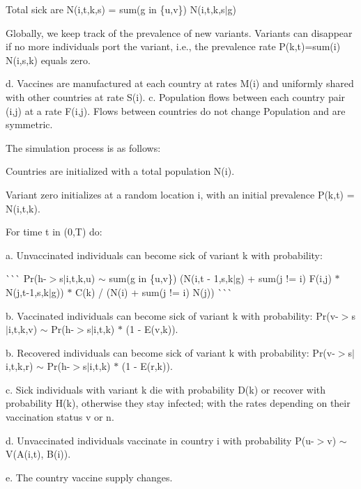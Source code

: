 \begin{DoxyEnumerate}
Total sick are {\ttfamily N(i,t,k,s) = sum(g in \{u,v\}) N(i,t,k,s$\vert$g)}

Globally, we keep track of the prevalence of new variants. Variants can disappear if no more individuals port the variant, i.\+e., the prevalence rate {\ttfamily P(k,t)=sum(i) N(i,s,k)} equals zero.

d. Vaccines are manufactured at each country at rates {\ttfamily M(i)} and uniformly shared with other countries at rate {\ttfamily S(i).} c. Population flows between each country pair {\ttfamily (i,j)} at a rate {\ttfamily F(i,j).} Flows between countries do not change Population and are symmetric.
\item The simulation process is as follows\+:
\begin{DoxyEnumerate}
\item Countries are initialized with a total population {\ttfamily N(i).}
\item Variant zero initializes at a random location {\ttfamily i,} with an initial prevalence {\ttfamily P(k,t) = N(i,t,k).}
\item For time {\ttfamily t} in {\ttfamily (0,T)} do\+:

a. Unvaccinated individuals can become sick of variant {\ttfamily k} with probability\+:

\`{}\`{}\`{} Pr(h-\/$>$s$\vert$i,t,k,u) $\sim$ sum(g in \{u,v\}) (N(i,t -\/ 1,s,k$\vert$g) + sum(j != i) F(i,j) $\ast$ N(j,t-\/1,s,k$\vert$g)) $\ast$ C(k) / (N(i) + sum(j != i) N(j)) \`{}\`{}\`{}

b. Vaccinated individuals can become sick of variant {\ttfamily k} with probability\+: {\ttfamily Pr(v-\/$>$s$\vert$i,t,k,v) $\sim$ Pr(h-\/$>$s$\vert$i,t,k) $\ast$ (1 -\/ E(v,k)).}

b. Recovered individuals can become sick of variant {\ttfamily k} with probability\+: {\ttfamily Pr(v-\/$>$s$\vert$i,t,k,r) $\sim$ Pr(h-\/$>$s$\vert$i,t,k) $\ast$ (1 -\/ E(r,k)).}

c. Sick individuals with variant {\ttfamily k} die with probability {\ttfamily D(k)} or recover with probability {\ttfamily H(k)}, otherwise they stay infected; with the rates depending on their vaccination status {\ttfamily v} or {\ttfamily n.}

d. Unvaccinated individuals vaccinate in country {\ttfamily i} with probability {\ttfamily P(u-\/$>$v) $\sim$ V(A(i,t), B(i)).}

e. The country vaccine supply changes. 
\end{DoxyEnumerate}
\end{DoxyEnumerate}